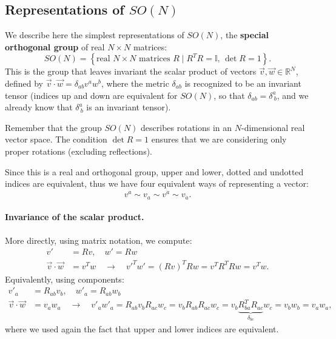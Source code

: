 \subsection{Representations of \texorpdfstring{$SO(N)$}{SO(N)}}

We describe here the simplest representations of \(SO(N)\), the \textbf{special orthogonal group} of real \(N \times N\) matrices:
\[
    SO(N) = \left\{ \text{real } N \times N \text{ matrices } R \mid R^T R = \mathbb{I}, \, \det R = 1 \right\}.
\]
This is the group that leaves invariant the scalar product of vectors \(\vec{v}, \vec{w} \in \mathbb{R}^N\), defined by \(\vec{v} \cdot \vec{w} = \delta_{ab} v^a w^b\), where the metric \(\delta_{ab}\) is recognized to be an invariant tensor (indices up and down are equivalent for \(SO(N)\), so that \(\delta_{ab} = \delta^a_{\ b}\), and we already know that \(\delta^a_{\ b}\) is an invariant tensor).

Remember that the group \(SO(N)\) describes rotations in an \(N\)-dimensional real vector space. The condition \(\det R = 1\) ensures that we are considering only proper rotations (excluding reflections).

Since this is a real and orthogonal group, upper and lower, dotted and undotted indices are equivalent, thus we have four equivalent ways of representing a vector:
\[
    v^a \sim v_a \sim v^{\dot{a}} \sim v_{\dot{a}}.
\]

\paragraph{Invariance of the scalar product.}
More directly, using matrix notation, we compute:
\[
    \begin{aligned}
        v'                    & = R v, \quad w' = R w                                                        \\
        \vec{v} \cdot \vec{w} & = v^T w \quad \rightarrow \quad v'^T w' = (R v)^T R w = v^T R^T R w = v^T w.
    \end{aligned}
\]
Equivalently, using components:
\[
    \begin{aligned}
        v'_a                  & = R_{ab} v_b, \quad w'_a = R_{ab} w_b                                                                                                                                 \\
        \vec{v} \cdot \vec{w} & = v_a w_a \quad \rightarrow \quad v'_a w'_a = R_{ab} v_b R_{ac} w_c = v_b R_{ab} R_{ac} w_c = v_b \underbrace{R^T_{ba} R_{ac}}_{\delta_{bc}} w_c = v_b w_b = v_a w_a,
    \end{aligned}
\]
where we used again the fact that upper and lower indices are equivalent.

